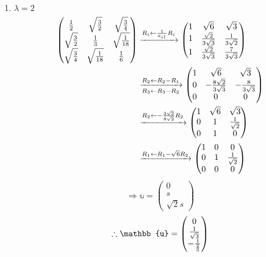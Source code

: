 \begin{enumerate}[wide, labelindent = 0pt, label = (\roman*)]
\item $\lambda = 2$
\begin{align*}
    \begin{pmatrix}
        \frac{1}{2}            & \sqrt{\frac{3}{2}} & \sqrt{\frac{3}{4}} \\
        \sqrt{\frac{3}{2}} & \frac{1}{3}            & \sqrt{\frac{1}{18}}    \\
        \sqrt{\frac{3}{4}} & \sqrt{\frac{1}{18}}    & \frac{1}{6}
    \end{pmatrix}
    &\xrightarrow{R_i \leftarrow \frac{1}{a_{i1}} R_i} \begin{pmatrix}
        1 & \sqrt{6}          & \sqrt{3} \\
        1 & \frac{\sqrt{2}}{3\sqrt{3}} & \frac{1}{3\sqrt{2}}    \\
        1 & \frac{\sqrt{2}}{3\sqrt{3}}  & \frac{7}{3\sqrt{3}}
    \end{pmatrix} \\
    &\xrightarrow[R_3 \leftarrow R_3 - R_2]{R_2 \leftarrow R_2 - R_1} \begin{pmatrix}
        1 & \sqrt{6}                     & \sqrt{3}             \\
        0 & -\frac{8\sqrt{2}}{3\sqrt{3}} & -\frac{8}{3\sqrt{3}} \\
        0 & 0                            & 0
    \end{pmatrix} \\
    &\xrightarrow{R_2 \leftarrow -\frac{3\sqrt{3}}{8\sqrt{2}} R_2} \begin{pmatrix}
        1 & \sqrt{6} & \sqrt{3}       \\
        0 & 1        & \frac{1}{\sqrt{2}} \\
        0 & 1        & 0
    \end{pmatrix} \\
    &\xrightarrow{R_1 \leftarrow R_1 - \sqrt{6}R_2} \begin{pmatrix}
        1 & 0 & 0        \\
        0 & 1 & \frac{1}{\sqrt{2}} \\
        0 & 0 & 0
    \end{pmatrix}
\end{align*}
\[
    \Rightarrow \mathbb{u} = \begin{pmatrix}
        0 \\ s \\ \sqrt{2}s
    \end{pmatrix}
\]
\[
    \therefore \mathbb{u} = \begin{pmatrix}
        0 \\ \inv{\sqrt{3}} \\ -\inv{\frac{2}{3}}
    \end{pmatrix}
\]


\end{enumerate}
